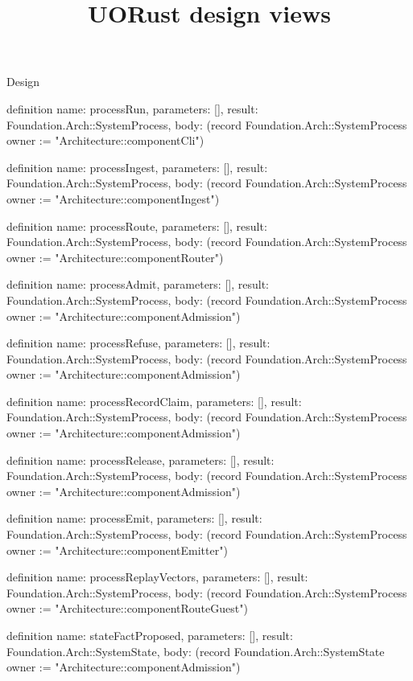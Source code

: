 \begin{lexlean}{Design}
\title{UORust design views}
\begin{semanticmodule}
definition{
  name: processRun,
  parameters: [],
  result: Foundation.Arch::SystemProcess,
  body: (record Foundation.Arch::SystemProcess {owner := "Architecture::componentCli"})
}

definition{
  name: processIngest,
  parameters: [],
  result: Foundation.Arch::SystemProcess,
  body: (record Foundation.Arch::SystemProcess {owner := "Architecture::componentIngest"})
}

definition{
  name: processRoute,
  parameters: [],
  result: Foundation.Arch::SystemProcess,
  body: (record Foundation.Arch::SystemProcess {owner := "Architecture::componentRouter"})
}

definition{
  name: processAdmit,
  parameters: [],
  result: Foundation.Arch::SystemProcess,
  body: (record Foundation.Arch::SystemProcess {owner := "Architecture::componentAdmission"})
}

definition{
  name: processRefuse,
  parameters: [],
  result: Foundation.Arch::SystemProcess,
  body: (record Foundation.Arch::SystemProcess {owner := "Architecture::componentAdmission"})
}

definition{
  name: processRecordClaim,
  parameters: [],
  result: Foundation.Arch::SystemProcess,
  body: (record Foundation.Arch::SystemProcess {owner := "Architecture::componentAdmission"})
}

definition{
  name: processRelease,
  parameters: [],
  result: Foundation.Arch::SystemProcess,
  body: (record Foundation.Arch::SystemProcess {owner := "Architecture::componentAdmission"})
}

definition{
  name: processEmit,
  parameters: [],
  result: Foundation.Arch::SystemProcess,
  body: (record Foundation.Arch::SystemProcess {owner := "Architecture::componentEmitter"})
}

definition{
  name: processReplayVectors,
  parameters: [],
  result: Foundation.Arch::SystemProcess,
  body: (record Foundation.Arch::SystemProcess {owner := "Architecture::componentRouteGuest"})
}

definition{
  name: stateFactProposed,
  parameters: [],
  result: Foundation.Arch::SystemState,
  body: (record Foundation.Arch::SystemState {owner := "Architecture::componentAdmission"})
}


\end{semanticmodule}
\end{lexlean}
